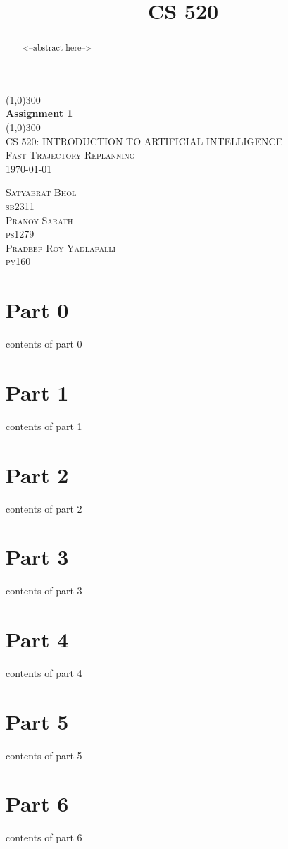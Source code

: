 \documentclass{article}
\title{CS 520}
\begin{document}
\begin{titlepage}
	\begin{center}
    \line(1,0){300}\\
    [0.65cm]
	\huge{\bfseries Assignment 1}\\
	\line(1,0){300}\\
	\textsc{\Large CS 520: INTRODUCTION TO ARTIFICIAL INTELLIGENCE \\ Fast Trajectory Replanning}\\
	\textsc{\LARGE \today}\\
	[5.5cm]     
	\end{center}
	\begin{flushright}
		\textsc{\Large Satyabrat Bhol\\sb2311}\\
		[0.5cm]
		\textsc{\Large Pranoy Sarath\\ps1279}\\
		[0.5cm]
            \textsc{\Large Pradeep Roy Yadlapalli\\py160}\\
		[0.5cm]
	\end{flushright}
\end{titlepage}

\begin{abstract}
<--abstract here--> 
\end{abstract}

\section*{Part 0}
contents of part 0

\section*{Part 1}
contents of part 1

\section*{Part 2}
contents of part 2

\newpage

\section*{Part 3}
contents of part 3

\section*{Part 4}
contents of part 4

\section*{Part 5}
contents of part 5

\newpage

\section*{Part 6}
contents of part 6
\end{document}
